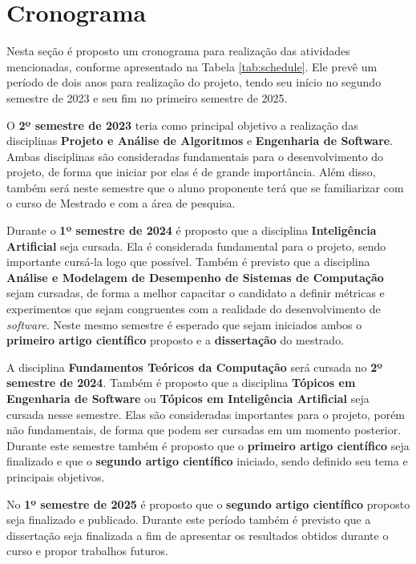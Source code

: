 \section{Cronograma}
\label{sec:schedule}

Nesta seção é proposto um cronograma para realização das atividades mencionadas, conforme apresentado na Tabela \ref{tab:schedule}. Ele prevê um período de dois anos para realização do projeto, tendo seu início no segundo semestre de 2023 e seu fim no primeiro semestre de 2025.



O \textbf{2º semestre de 2023} teria como principal objetivo a realização das disciplinas \textbf{Projeto e Análise de Algoritmos} e \textbf{Engenharia de Software}. Ambas disciplinas são consideradas fundamentais para o desenvolvimento do projeto, de forma que iniciar por elas é de grande importância. Além disso, também será neste semestre que o aluno proponente terá que se familiarizar com o curso de Mestrado e com a área de pesquisa.

Durante o \textbf{1º semestre de 2024} é proposto que a disciplina \textbf{Inteligência Artificial} seja cursada. Ela é considerada fundamental para o projeto, sendo importante cursá-la logo que possível. Também é previsto que a disciplina \textbf{Análise e Modelagem de Desempenho de Sistemas de Computação} sejam cursadas, de forma a melhor capacitar o candidato a definir métricas e experimentos que sejam congruentes com a realidade do desenvolvimento de \textit{software}. Neste mesmo semestre é esperado que sejam iniciados ambos o \textbf{primeiro artigo científico} proposto e a \textbf{dissertação} do mestrado.

A disciplina \textbf{Fundamentos Teóricos da Computação} será cursada no \textbf{2º semestre de 2024}. Também é proposto que a disciplina \textbf{Tópicos em Engenharia de Software} ou \textbf{Tópicos em Inteligência Artificial} seja cursada nesse semestre. Elas são consideradas importantes para o projeto, porém não fundamentais, de forma que podem ser cursadas em um momento posterior. Durante este semestre também é proposto que o \textbf{primeiro artigo científico} seja finalizado e que o \textbf{segundo artigo científico} iniciado, sendo definido seu tema e principais objetivos.

No \textbf{1º semestre de 2025} é proposto que o \textbf{segundo artigo científico} proposto seja finalizado e publicado. Durante este período também é previsto que a dissertação seja finalizada a fim de apresentar os resultados obtidos durante o curso e propor trabalhos futuros.
